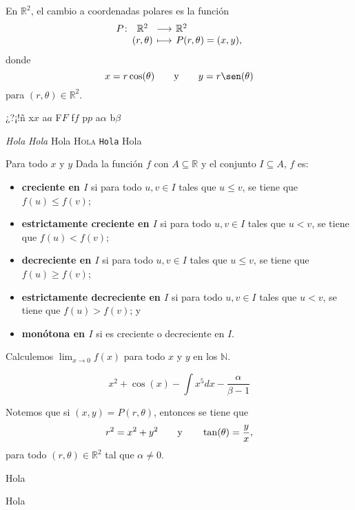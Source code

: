 \documentclass[a4]{aleph-notas-beta}
\begin{document}
\encabezado

\begin{defi}
    En $\mathbb{R}^2$, el cambio a coordenadas polares es la función
    \[
        \funcion{P}{\mathbb{R}^2}{\mathbb{R}^2}
        {(r,\theta)}{P(r , \theta)=(x,y),}
    \]
    donde
    \[
        x= r\cos(\theta)
        \texty
        y= r\sen(\theta)
    \]
    para $(r,\theta)\in \mathbb{R}^2$.
\end{defi}

¿?¡!ñ x$x$ a$a$ F$F$ f$f$ p$p$ a$\alpha$ b$\beta$

\textit{Hola} \textsl{Hola} Hola \textsc{Hola} \texttt{Hola} \textsf{Hola}

Para todo $x$ y $y$ Dada la función $f$ con $A\subseteq \mathbb{R}$ y el conjunto $I\subseteq A$, $f$ es:
    \begin{itemize}
    \item
       \textbf{creciente en $I$} si para todo $u,v\in I$ tales que $u\leq v$, se tiene que $f(u)\leq f(v)$;
    \item
        \textbf{estrictamente creciente en $I$} si para todo $u,v\in I$ tales que $u< v$, se tiene que $f(u)< f(v)$;
    \item
        \textbf{decreciente en $I$} si para todo $u,v\in I$ tales que $u\leq v$, se tiene que $f(u)\geq f(v)$;
    \item
        \textbf{estrictamente decreciente en $I$} si para todo $u,v\in I$ tales que $u< v$, se tiene que $f(u)> f(v)$; y
    \item
        \textbf{monótona en $I$} si es creciente o decreciente en $I$.
    \end{itemize}

Calculemos $\displaystyle\lim_{x\to 0}f(x)$ para todo $x$ y $y$ en los $\mathbb{N}$.

\[
    x^2 + \cos(x) - \int x^5 dx - \frac{\alpha}{\beta-1}
\]

\begin{advertencia}
    Notemos que si $(x,y)=P(r,\theta)$, entonces se tiene que
    \[
        r^2=x^2+y^2
        \qquad\text{y}\qquad
        \tan(\theta)=\frac y x,
    \]  
    para todo $(r,\theta)\in\mathbb{R}^2$ tal que $\alpha\neq 0$.
\end{advertencia}

\begin{teo}
    Hola
\end{teo}

\begin{teo}
    Hola
\end{teo}
\end{document}
